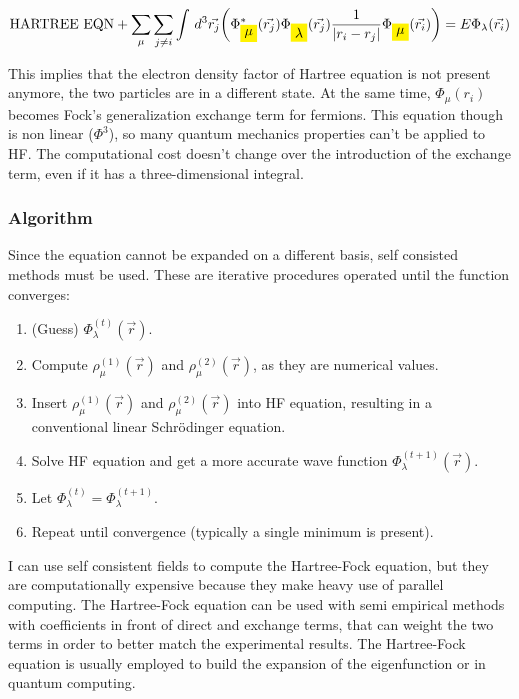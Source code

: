 		$$\text{HARTREE EQN}+\sum_\mu \sum_{j \neq i} \int\,d^3\vec{r_j}\bigg(\Phi^*_{\mathcolorbox{yellow}{\mu}}(\vec{r_j})\Phi_{\mathcolorbox{yellow}{\lambda}}(\vec{r_j})\frac{1}{|r_i-r_j|}\Phi_{\mathcolorbox{yellow}{\mu}}(\vec{r_i})\bigg)=E\Phi_\lambda(\vec{r_i})$$

		This implies that the electron density factor of Hartree equation is not present anymore, the two particles are in a different state.
		At the same time, $\Phi_\mu(r_i)$ becomes Fock's generalization exchange term for fermions.
		This equation though is non linear ($\Phi^3$), so many quantum mechanics properties can't be applied to HF.
		The computational cost doesn't change over the introduction of the exchange term, even if it has a three-dimensional integral.

		\subsubsection{Algorithm}
		Since the equation cannot be expanded on a different basis, self consisted methods must be used.
		These are iterative procedures operated until the function converges:

		\begin{multicols}{2}
			\begin{enumerate}
				\item (Guess) $\Phi^{(t)}_\lambda (\vec{r})$.
				\item Compute $\rho_\mu^{(1)}(\vec{r})$ and $\rho_\mu^{(2)}(\vec{r})$, as they are numerical values.
				\item Insert $\rho_\mu^{(1)}(\vec{r})$ and $\rho_\mu^{(2)}(\vec{r})$ into HF equation, resulting in a conventional linear Schr\"odinger equation.
				\item Solve HF equation and get a more accurate wave function $\Phi^{(t+1)}_\lambda (\vec{r})$.
				\item Let $\Phi^{(t)}_\lambda = \Phi^{(t+1)}_\lambda$.
				\item Repeat until convergence (typically a single minimum is present).
			\end{enumerate}
		\end{multicols}

		I can use self consistent fields to compute the Hartree-Fock equation, but they are computationally expensive because they make heavy use of parallel computing.
		The Hartree-Fock equation can be used with semi empirical methods with coefficients in front of direct and exchange terms, that can weight the two terms in order to better match the experimental results.
		The Hartree-Fock equation is usually employed to build the expansion of the eigenfunction or in quantum computing.

